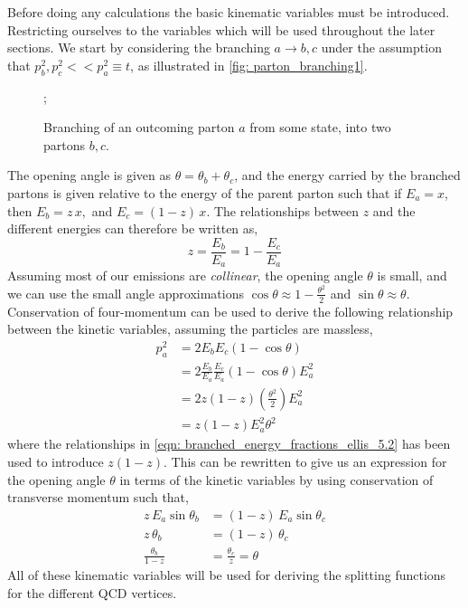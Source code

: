 \documentclass[main.tex]{subfiles}
\begin{document}
Before doing any calculations the basic kinematic variables must be introduced. Restricting ourselves to the variables which will be used throughout the later sections. We start by considering the branching \(a\rightarrow b,c\) under the assumption that \(p_b^2, p_c^2 << p_a^2 \equiv t\), as illustrated in \autoref{fig: parton_branching1}.
\begin{figure}[htb]
    \centering
    ;
    \caption{Branching of an outcoming parton \(a\) from some state, into two partons \(b,c\).}
    \label{fig: parton_branching1}
\end{figure}
The opening angle is given as \(\theta = \theta_b+\theta_c\), and the energy carried by the branched partons is given relative to the energy of the parent parton such that if \(E_a =x\), then \(E_b=z\,x,\) and \(E_c=(1-z)\,x\). The relationships between \(z\) and the different energies can therefore be written as,
\begin{equation}\label{eqn: branched_energy_fractions_ellis_5.2}
    z = \frac{E_b}{E_a} = 1- \frac{E_c}{E_a}
\end{equation}
Assuming most of our emissions are \emph{collinear}, the opening angle \(\theta\) is small, and we can use the small angle approximations \(\cos \theta \approx 1- \frac{\theta^2}{2}\) and \(\sin \theta \approx \theta\). Conservation of four-momentum can be used to derive the following relationship between the kinetic variables, assuming the particles are massless, 
\begin{align}
    p_a^2 &= 2 E_b E_c (1-\cos \theta) \nonumber\\ 
    &= 2 \frac{E_b}{E_a} \frac{E_c}{E_a} (1-\cos \theta) E_a^2 \nonumber\\
    &= 2 z (1-z)  (\frac{\theta^2}{2}) E_a^2 \nonumber\\
    &= z (1-z) E_a^2 \theta^2
\end{align}
where the relationships in \autoref{eqn: branched_energy_fractions_ellis_5.2} has been used to introduce \(z(1-z)\). This can be rewritten to give us an expression for the opening angle \(\theta\) in terms of the kinetic variables by using conservation of transverse momentum such that,
\begin{align}\label{eqn: theta_momentum_conv_ellis_5.4}
    z\, E_a \sin \theta_b &= (1-z)\, E_a \sin \theta_c \nonumber \\
    z\, \theta_b &= (1-z)\, \theta_c  \nonumber \\
    \frac{\theta_b}{1-z} &= \frac{\theta_c}{z} = \theta
\end{align}
All of these kinematic variables will be used for deriving the splitting functions for the different QCD vertices. 
\end{document}
